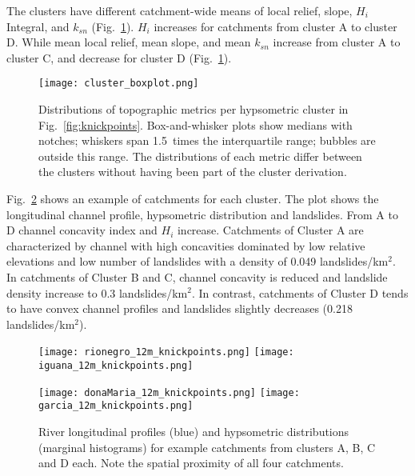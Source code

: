 \documentclass[draft]{agujournal2019}
\begin{document}
\par The clusters have different catchment-wide means of local relief, slope, $H_i$ Integral, and $k_{sn}$ (Fig.~\ref{fig:cluster2}). $H_i$ increases for catchments from cluster A to cluster D.  While mean local relief, mean slope, and mean $k_{sn}$ increase from cluster A to cluster C, and decrease for cluster D (Fig.~\ref{fig:cluster2}).

\begin{figure}[ht!]
     \centering
        {\texttt{[image: cluster\_boxplot.png]}}
    \caption{Distributions of topographic metrics per hypsometric cluster in Fig.~\ref{fig:knickpoints}. Box-and-whisker plots show medians with notches; whiskers span 1.5~times the interquartile range; bubbles are outside this range. The distributions of each metric differ between the clusters without having been part of the cluster derivation.}
  \label{fig:cluster2}
\end{figure}

\par Fig.~\ref{fig:cluster-profile} shows an example of catchments for each cluster. The plot shows the longitudinal channel profile, hypsometric distribution and landslides. From A to D channel concavity index and $H_i$ increase. Catchments of Cluster A are characterized by channel with high concavities dominated by low relative elevations and low number of landslides with a density of 0.049 landslides/km$^2$. In catchments of Cluster B and C, channel concavity is reduced and landslide density increase to 0.3 landslides/km$^2$. In contrast, catchments of Cluster D tends to have convex channel profiles and landslides slightly decreases (0.218 landslides/km$^2$).

\begin{figure}[ht!]
  \begin{minipage}{.48\linewidth}
    \centering
      {\texttt{[image: rionegro\_12m\_knickpoints.png]}}
      {\texttt{[image: iguana\_12m\_knickpoints.png]}}
  \end{minipage}\quad
  \begin{minipage}{.48\linewidth}
    \centering
      {\texttt{[image: donaMaria\_12m\_knickpoints.png]}}
      {\texttt{[image: garcia\_12m\_knickpoints.png]}}
  \end{minipage}
    \caption{River longitudinal profiles (blue) and hypsometric distributions (marginal histograms) for example catchments from clusters A, B, C and D each. Note the spatial proximity of all four catchments.}
    \label{fig:cluster-profile}
\end{figure}
\end{document}
